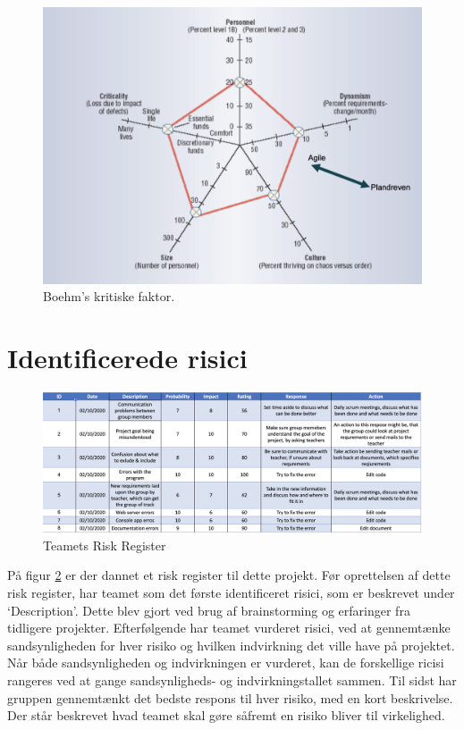 \begin{figure}
    \includegraphics[width=\linewidth]{figures/Boehm.png}
    \caption{Boehm's kritiske faktor.}
    \label{fig:Boehm}
\end{figure}

\section{Identificerede risici}\label{sec:identified_risks}
\begin{figure}
    \includegraphics[width=\linewidth]{figures/RiskRegister.png}
    \caption{Teamets Risk Register}
    \label{fig:Risk}
\end{figure}
På figur \ref{fig:Risk} er der dannet et risk register til dette projekt. Før oprettelsen af dette risk register, har teamet som det første identificeret risici, som er beskrevet under ‘Description’. Dette blev gjort ved brug af brainstorming og erfaringer fra tidligere projekter. Efterfølgende har teamet vurderet risici, ved at gennemtænke sandsynligheden for hver risiko og hvilken indvirkning det ville have på projektet. Når både sandsynligheden og indvirkningen er vurderet, kan de forskellige ricisi rangeres ved at gange sandsynligheds- og indvirkningstallet sammen. Til sidst har gruppen gennemtænkt det bedste respons til hver risiko, med en kort beskrivelse. Der står beskrevet hvad teamet skal gøre såfremt en risiko bliver til virkelighed. 

